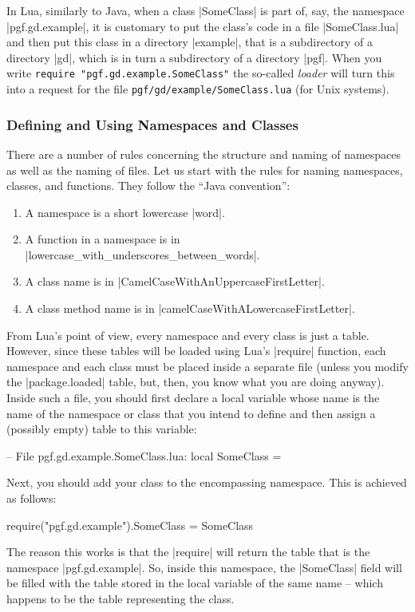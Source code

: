 In Lua, similarly to Java, when a class |SomeClass| is part of, say, the
namespace |pgf.gd.example|, it is customary to put the class's code in a file
|SomeClass.lua| and then put this class in a directory |example|, that is a
subdirectory of a directory |gd|, which is in turn a subdirectory of a
directory |pgf|. When you write \texttt{require "pgf.gd.example.SomeClass"} the
so-called \emph{loader} will turn this into a request for the file
\texttt{pgf/gd/example/SomeClass.lua} (for Unix systems).


\subsubsection{Defining and Using Namespaces and Classes}

There are a number of rules concerning the structure and naming of namespaces
as well as the naming of files. Let us start with the rules for naming
namespaces, classes, and functions. They follow the ``Java convention'':
%
\begin{enumerate}
    \item A namespace is a short lowercase |word|.
    \item A function in a namespace is in
        |lowercase_with_underscores_between_words|.
    \item A class name is in |CamelCaseWithAnUppercaseFirstLetter|.
    \item A class method name is in |camelCaseWithALowercaseFirstLetter|.
\end{enumerate}

From Lua's point of view, every namespace and every class is just a table.
However, since these tables will be loaded using Lua's |require| function, each
namespace and each class must be placed inside a separate file (unless you
modify the |package.loaded| table, but, then, you know what you are doing
anyway). Inside such a file, you should first declare a local variable whose
name is the name of the namespace or class that you intend to define and then
assign a (possibly empty) table to this variable:
%
\begin{codeexample}[code only, tikz syntax=false]
-- File pgf.gd.example.SomeClass.lua:
local SomeClass = {}
\end{codeexample}
%
Next, you should add your class to the encompassing namespace. This is achieved
as follows:
%
\begin{codeexample}[code only, tikz syntax=false]
require("pgf.gd.example").SomeClass = SomeClass
\end{codeexample}
%
The reason this works is that the |require| will return the table that is the
namespace |pgf.gd.example|. So, inside this namespace, the |SomeClass| field
will be filled with the table stored in the local variable of the same name --
which happens to be the table representing the class.

